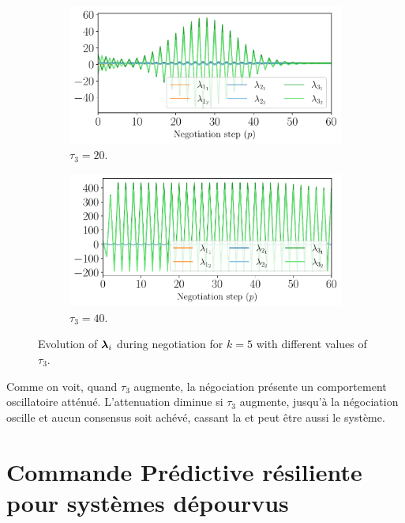 \documentclass[../main.tex]{subfiles}
\begin{document}
\begin{figure}[h]
\begin{subfigure}{0.45\textwidth}
    \includegraphics[width=\textwidth]{../img/example_primal_decomposition/example_vary_tau_lambda_tau_20.0.pdf}
    \caption{$\tau_{3}=20$.}\label{fig:example_vary_tau_lambda_tau_20}
  \end{subfigure}
  \begin{subfigure}{0.45\textwidth}
    \includegraphics[width=\textwidth]{../img/example_primal_decomposition/example_vary_tau_lambda_tau_40.0.pdf}
    \caption{$\tau_{3}=40$.}\label{fig:example_vary_tau_lambda_tau_40}
  \end{subfigure}
    \caption{Evolution of $\boldsymbol{\lambda}_{i}$ during negotiation for $k=5$ with different values of $\tau_{3}$.}\label{fig:example_vary_tau_lambda_fr}
\end{figure}
Comme on voit, quand $\tau_{3}$ augmente, la négociation présente un comportement oscillatoire atténué.
L'attenuation diminue si $\tau_{3}$ augmente, jusqu'à la négociation oscille et aucun consensus soit achévé, cassant la \dmpc{} et peut être aussi le système.

\newpage
\section{Commande Prédictive résiliente pour systèmes dépourvus}\label{sec:comm-pred-resil}
\end{document}
